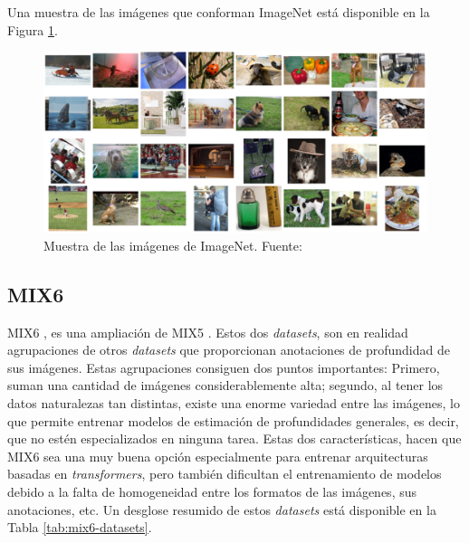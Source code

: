 Una muestra de las imágenes que conforman ImageNet está disponible en la Figura \ref{fig:imagenet}.
\begin{figure}[H]
\centering
\includegraphics[width=\textwidth]{imagenes/imagenet.png}
\caption{Muestra de las imágenes de ImageNet. Fuente: \cite{ILSVRC15}}
\label{fig:imagenet}
\end{figure}

\subsection{MIX6}
MIX6 \cite{visiontransformersDPT}, es una ampliación de MIX5 \cite{midas-intel}. Estos dos \textit{datasets}, son en realidad agrupaciones de otros \textit{datasets} que proporcionan anotaciones de profundidad de sus imágenes. Estas agrupaciones consiguen dos puntos importantes: Primero, suman una cantidad de imágenes considerablemente alta; segundo, al tener los datos naturalezas tan distintas, existe una enorme variedad entre las imágenes, lo que permite entrenar modelos de estimación de profundidades generales, es decir, que no estén especializados en ninguna tarea. Estas dos características, hacen que MIX6 sea una muy buena opción especialmente para entrenar arquitecturas basadas en \textit{transformers}, pero también dificultan el entrenamiento de modelos debido a la falta de homogeneidad entre los formatos de las imágenes, sus anotaciones, etc. Un desglose resumido de estos \textit{datasets} está disponible en la Tabla \ref{tab:mix6-datasets}.

